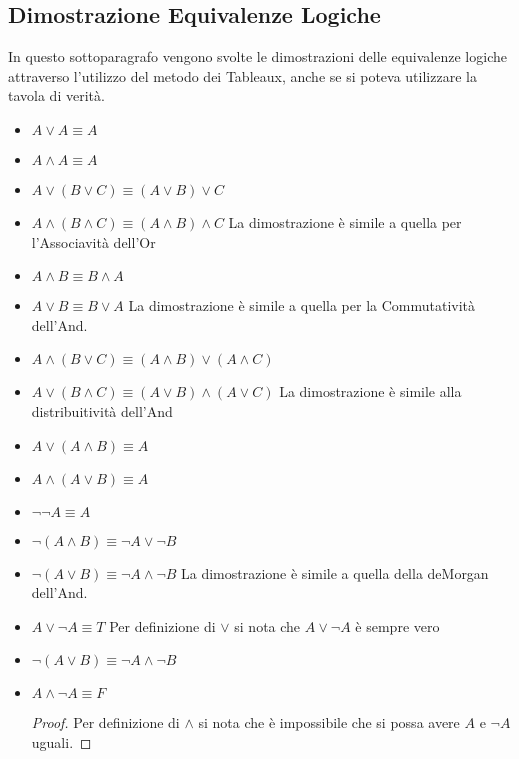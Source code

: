 \subsection{Dimostrazione Equivalenze Logiche}
In questo sottoparagrafo vengono svolte le dimostrazioni delle equivalenze logiche
attraverso l'utilizzo del metodo dei Tableaux, anche se si poteva utilizzare la tavola di verità.
\begin{itemize}
    \item $A \lor A \equiv A$
          
    \item $A \land A \equiv A$
          
    \item $A \lor (B \lor C) \equiv  (A \lor B) \lor C$
          
    \item $A \land (B \land C) \equiv (A \land B) \land C$
          La dimostrazione è simile a quella per l'Associavità dell'Or
    \item $A \land B \equiv B \land A$
          
    \item $A \lor B \equiv B \lor A$
          La dimostrazione è simile a quella per la Commutatività dell'And.
    \item $A \land (B \lor C) \equiv (A \land B) \lor (A \land C)$
          
    \item $A \lor (B \land C)  \equiv (A \lor B) \land (A \lor C)$
          La dimostrazione è simile alla distribuitività dell'And
    \item $A \lor (A \land B) \equiv A$
          
    \item $A \land (A \lor B)  \equiv  A$
          
    \item $\neg \neg A \equiv A$
          
    \item $\neg(A \land B)  \equiv  \neg A \lor \neg B$
          
    \item $\neg (A \lor B)  \equiv  \neg A \land \neg B$
          La dimostrazione è simile a quella della deMorgan dell'And.
    \item $A \lor \neg A \equiv T$
          Per definizione di $\lor$ si nota che $A \lor \neg A$ è sempre vero
    \item $\neg (A \lor B)  \equiv  \neg A \land \neg B$
          
    \item $A \land \neg A \equiv F$
          \begin{proof}
             Per definizione di $\land$ si nota che è impossibile che si possa avere
             $A$ e $\neg A$ uguali.
         \end{proof}
\end{itemize}
